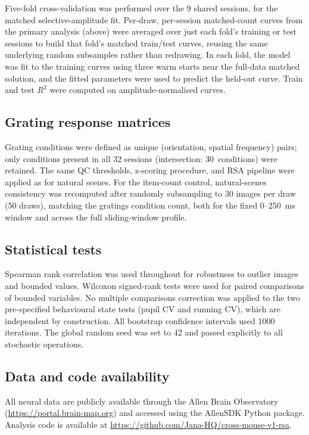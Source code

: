 \documentclass[11pt,onecolumn]{article}
\begin{document}
Five-fold cross-validation was performed over the 9 shared sessions, for
the matched selective-amplitude fit.  Per-draw, per-session matched-count
curves from the primary analysis (above) were averaged over just each
fold's training or test sessions to build that fold's matched train/test
curves, reusing the same underlying random subsamples rather than
redrawing.  In each fold, the model was fit to the training curves using
three warm starts near the full-data matched solution, and the fitted
parameters were used to predict the held-out curve.  Train and test
$R^2$ were computed on amplitude-normalised curves.

\subsection{Grating response matrices}

Grating conditions were defined as unique (orientation, spatial frequency)
pairs; only conditions present in all 32 sessions (intersection:
30~conditions) were retained.  The same QC thresholds, z-scoring
procedure, and RSA pipeline were applied as for natural scenes.  For the
item-count control, natural-scenes consistency was recomputed after
randomly subsampling to 30 images per draw (50 draws), matching the
gratings condition count, both for the fixed 0--250~ms window and across
the full sliding-window profile.

\subsection{Statistical tests}

Spearman rank correlation was used throughout for robustness to outlier
images and bounded values.  Wilcoxon signed-rank tests were used for
paired comparisons of bounded variables.  No multiple comparisons
correction was applied to the two pre-specified behavioural state tests
(pupil CV and running CV), which are independent by construction.  All
bootstrap confidence intervals used 1000 iterations.  The global random
seed was set to 42 and passed explicitly to all stochastic operations.

\subsection{Data and code availability}

All neural data are publicly available through the Allen Brain Observatory
(\url{https://portal.brain-map.org}) and accessed using the AllenSDK
Python package.  Analysis code is available at
\url{https://github.com/Jana-HQ/cross-mouse-v1-rsa}.
\end{document}
